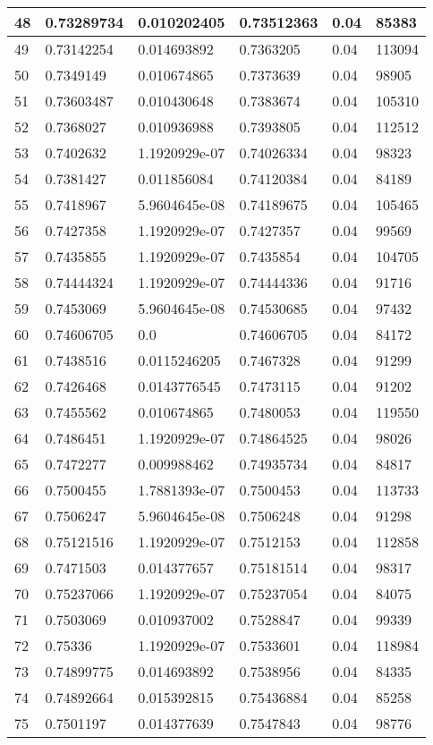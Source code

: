 \begin{longtable}{|l|l|l|l|l|l|}
48 & 0.73289734 & 0.010202405 & 0.73512363 & 0.04 & 85383 \\ \hline 
49 & 0.73142254 & 0.014693892 & 0.7363205 & 0.04 & 113094 \\ \hline 
50 & 0.7349149 & 0.010674865 & 0.7373639 & 0.04 & 98905 \\ \hline 
51 & 0.73603487 & 0.010430648 & 0.7383674 & 0.04 & 105310 \\ \hline 
52 & 0.7368027 & 0.010936988 & 0.7393805 & 0.04 & 112512 \\ \hline 
53 & 0.7402632 & 1.1920929e-07 & 0.74026334 & 0.04 & 98323 \\ \hline 
54 & 0.7381427 & 0.011856084 & 0.74120384 & 0.04 & 84189 \\ \hline 
55 & 0.7418967 & 5.9604645e-08 & 0.74189675 & 0.04 & 105465 \\ \hline 
56 & 0.7427358 & 1.1920929e-07 & 0.7427357 & 0.04 & 99569 \\ \hline 
57 & 0.7435855 & 1.1920929e-07 & 0.7435854 & 0.04 & 104705 \\ \hline 
58 & 0.74444324 & 1.1920929e-07 & 0.74444336 & 0.04 & 91716 \\ \hline 
59 & 0.7453069 & 5.9604645e-08 & 0.74530685 & 0.04 & 97432 \\ \hline 
60 & 0.74606705 & 0.0 & 0.74606705 & 0.04 & 84172 \\ \hline 
61 & 0.7438516 & 0.0115246205 & 0.7467328 & 0.04 & 91299 \\ \hline 
62 & 0.7426468 & 0.0143776545 & 0.7473115 & 0.04 & 91202 \\ \hline 
63 & 0.7455562 & 0.010674865 & 0.7480053 & 0.04 & 119550 \\ \hline 
64 & 0.7486451 & 1.1920929e-07 & 0.74864525 & 0.04 & 98026 \\ \hline 
65 & 0.7472277 & 0.009988462 & 0.74935734 & 0.04 & 84817 \\ \hline 
66 & 0.7500455 & 1.7881393e-07 & 0.7500453 & 0.04 & 113733 \\ \hline 
67 & 0.7506247 & 5.9604645e-08 & 0.7506248 & 0.04 & 91298 \\ \hline 
68 & 0.75121516 & 1.1920929e-07 & 0.7512153 & 0.04 & 112858 \\ \hline 
69 & 0.7471503 & 0.014377657 & 0.75181514 & 0.04 & 98317 \\ \hline 
70 & 0.75237066 & 1.1920929e-07 & 0.75237054 & 0.04 & 84075 \\ \hline 
71 & 0.7503069 & 0.010937002 & 0.7528847 & 0.04 & 99339 \\ \hline 
72 & 0.75336 & 1.1920929e-07 & 0.7533601 & 0.04 & 118984 \\ \hline 
73 & 0.74899775 & 0.014693892 & 0.7538956 & 0.04 & 84335 \\ \hline 
74 & 0.74892664 & 0.015392815 & 0.75436884 & 0.04 & 85258 \\ \hline 
75 & 0.7501197 & 0.014377639 & 0.7547843 & 0.04 & 98776 \\ \hline 
\end{longtable}